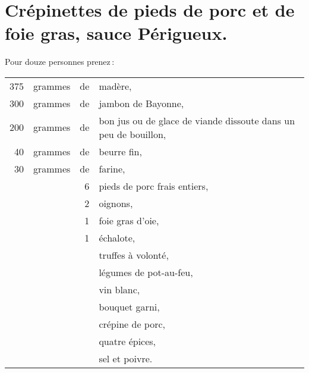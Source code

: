 \section*{\centering Crépinettes de pieds de porc et de foie gras, sauce Périgueux.}
{}

Pour douze personnes prenez :

\medskip

\footnotesize
\begin{longtable}{rrrp{18em}}
    375 & grammes & de & madère,                                                                          \\
    300 & grammes & de & jambon de Bayonne,                                                               \\
    200 & grammes & de & bon jus ou de glace de viande dissoute dans un peu de bouillon,                  \\
     40 & grammes & de & beurre fin,                                                                      \\
     30 & grammes & de & farine,                                                                          \\
        &         &  6 & pieds de porc frais entiers,                                                     \\
        &         &  2 & oignons,                                                                         \\
        &         &  1 & foie gras d'oie,                                                                 \\
        &         &  1 & échalote,                                                                        \\
        &         &    & truffes à volonté,                                                               \\
        &         &    & légumes de pot-au-feu,                                                           \\
        &         &    & vin blanc,                                                                       \\
        &         &    & bouquet garni,                                                                   \\
        &         &    & crépine de porc,                                                                 \\
        &         &    & quatre épices,                                                                   \\
        &         &    & sel et poivre.                                                                   \\
\end{longtable}
\normalsize

